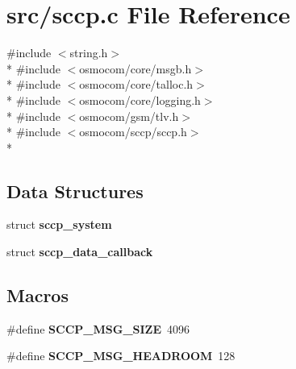 \section{src/sccp.c File Reference}
\label{sccp_8c}
{\ttfamily \#include $<$string.\+h$>$}\\*
{\ttfamily \#include $<$osmocom/core/msgb.\+h$>$}\\*
{\ttfamily \#include $<$osmocom/core/talloc.\+h$>$}\\*
{\ttfamily \#include $<$osmocom/core/logging.\+h$>$}\\*
{\ttfamily \#include $<$osmocom/gsm/tlv.\+h$>$}\\*
{\ttfamily \#include $<$osmocom/sccp/sccp.\+h$>$}\\*
\subsection*{Data Structures}
\begin{DoxyCompactItemize}
\item 
struct {\bf sccp\+\_\+system}
\item 
struct {\bf sccp\+\_\+data\+\_\+callback}
\end{DoxyCompactItemize}
\subsection*{Macros}
\begin{DoxyCompactItemize}
\item 
\#define {\bf S\+C\+C\+P\+\_\+\+M\+S\+G\+\_\+\+S\+I\+ZE}~4096
\item 
\#define {\bf S\+C\+C\+P\+\_\+\+M\+S\+G\+\_\+\+H\+E\+A\+D\+R\+O\+OM}~128
\end{DoxyCompactItemize}
